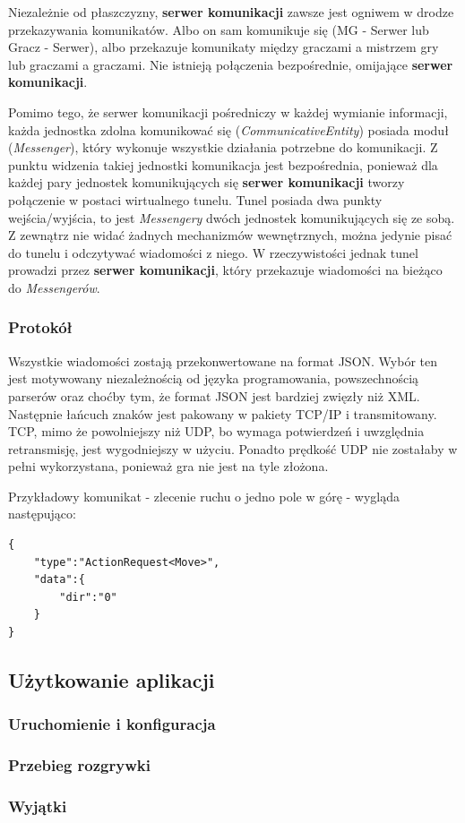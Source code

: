 \documentclass[11pt]{article}
\let\Oldsubsection\subsection
\renewcommand{\subsection}{\FloatBarrier\Oldsubsection}
\let\Oldsubsubsection\subsubsection
\renewcommand{\subsubsection}{\FloatBarrier\Oldsubsubsection}
\begin{document}
\par
Niezależnie od płaszczyzny, \textbf{serwer komunikacji} zawsze jest ogniwem w drodze przekazywania komunikatów. Albo on sam komunikuje się (MG - Serwer lub Gracz - Serwer), albo przekazuje komunikaty między graczami a mistrzem gry lub graczami a graczami. Nie istnieją połączenia bezpośrednie, omijające \textbf{serwer komunikacji}.
\par
Pomimo tego, że serwer komunikacji pośredniczy w każdej wymianie informacji, każda jednostka zdolna komunikować się (\textit{CommunicativeEntity}) posiada moduł (\textit{Messenger}), który wykonuje wszystkie działania potrzebne do komunikacji. Z punktu widzenia takiej jednostki komunikacja jest bezpośrednia, ponieważ dla każdej pary jednostek komunikujących się \textbf{serwer komunikacji} tworzy połączenie w postaci wirtualnego tunelu. Tunel posiada dwa punkty wejścia/wyjścia, to jest \textit{Messengery} dwóch jednostek komunikujących się ze sobą. Z zewnątrz nie widać żadnych mechanizmów wewnętrznych, można jedynie pisać do tunelu i odczytywać wiadomości z niego. W rzeczywistości jednak tunel prowadzi przez \textbf{serwer komunikacji}, który przekazuje wiadomości na bieżąco do \textit{Messengerów}.

\subsubsection{Protokół}
\par
Wszystkie wiadomości zostają przekonwertowane na format JSON. Wybór ten jest motywowany niezależnością od języka programowania, powszechnością parserów oraz choćby tym, że format JSON jest bardziej zwięzły niż XML. Następnie łańcuch znaków jest pakowany w pakiety TCP/IP i transmitowany. TCP, mimo że powolniejszy niż UDP, bo wymaga potwierdzeń i uwzględnia retransmisję, jest wygodniejszy w użyciu. Ponadto prędkość UDP nie zostałaby w pełni wykorzystana, ponieważ gra nie jest na tyle złożona.
\par
Przykładowy komunikat - zlecenie ruchu o jedno pole w górę - wygląda następująco:
\begin{lstlisting}
{ 
	"type":"ActionRequest<Move>",
	"data":{
		"dir":"0"
	}
}
\end{lstlisting}

\subsection{Użytkowanie aplikacji}

\subsubsection{Uruchomienie i konfiguracja}

\subsubsection{Przebieg rozgrywki}

\subsubsection{Wyjątki}
\end{document}
